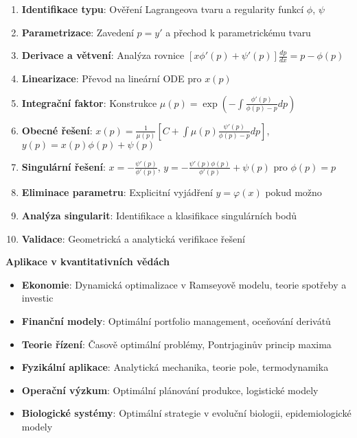 \begin{enumerate}
\item \textbf{Identifikace typu}: Ověření Lagrangeova tvaru a regularity funkcí $\phi$, $\psi$
\item \textbf{Parametrizace}: Zavedení $p = y'$ a přechod k parametrickému tvaru
\item \textbf{Derivace a větvení}: Analýza rovnice $[x\phi'(p) + \psi'(p)]\frac{dp}{dx} = p - \phi(p)$
\item \textbf{Linearizace}: Převod na lineární ODE pro $x(p)$
\item \textbf{Integrační faktor}: Konstrukce $\mu(p) = \exp\left(-\int \frac{\phi'(p)}{\phi(p)-p} dp\right)$
\item \textbf{Obecné řešení}: $x(p) = \frac{1}{\mu(p)} \left[ C + \int \mu(p) \frac{\psi'(p)}{\phi(p)-p} dp \right]$, $y(p) = x(p)\phi(p) + \psi(p)$
\item \textbf{Singulární řešení}: $x = -\frac{\psi'(p)}{\phi'(p)}$, $y = -\frac{\psi'(p)\phi(p)}{\phi'(p)} + \psi(p)$ pro $\phi(p) = p$
\item \textbf{Eliminace parametru}: Explicitní vyjádření $y = \varphi(x)$ pokud možno
\item \textbf{Analýza singularit}: Identifikace a klasifikace singulárních bodů
\item \textbf{Validace}: Geometrická a analytická verifikace řešení
\end{enumerate}

\vspace{1\baselineskip}

\noindent\textbf{Aplikace v kvantitativních vědách}

\begin{itemize}
\item \textbf{Ekonomie}: Dynamická optimalizace v Ramseyově modelu, teorie spotřeby a investic
\item \textbf{Finanční modely}: Optimální portfolio management, oceňování derivátů
\item \textbf{Teorie řízení}: Časově optimální problémy, Pontrjaginův princip maxima
\item \textbf{Fyzikální aplikace}: Analytická mechanika, teorie pole, termodynamika
\item \textbf{Operační výzkum}: Optimální plánování produkce, logistické modely
\item \textbf{Biologické systémy}: Optimální strategie v evoluční biologii, epidemiologické modely
\end{itemize}

